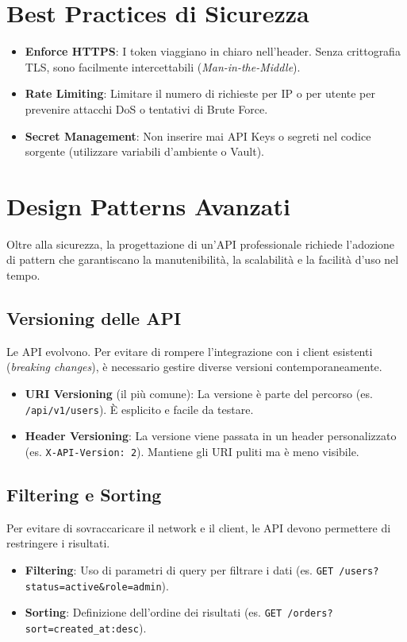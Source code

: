 \documentclass[11pt,a4paper]{report}
\begin{document}
\section{Best Practices di Sicurezza}
\begin{itemize}[leftmargin=3em]
    \item \textbf{Enforce HTTPS}: I token viaggiano in chiaro nell'header. Senza crittografia TLS, sono facilmente intercettabili (\textit{Man-in-the-Middle}).
    \item \textbf{Rate Limiting}: Limitare il numero di richieste per IP o per utente per prevenire attacchi DoS o tentativi di Brute Force.
    \item \textbf{Secret Management}: Non inserire mai API Keys o segreti nel codice sorgente (utilizzare variabili d'ambiente o Vault).
\end{itemize}

\section{Design Patterns Avanzati}
Oltre alla sicurezza, la progettazione di un'API professionale richiede l'adozione di pattern che garantiscano la manutenibilità, la scalabilità e la facilità d'uso nel tempo.

\subsection{Versioning delle API}
Le API evolvono. Per evitare di rompere l'integrazione con i client esistenti (\textit{breaking changes}), è necessario gestire diverse versioni contemporaneamente.
\begin{itemize}[leftmargin=3em]
    \item \textbf{URI Versioning} (il più comune): La versione è parte del percorso (es. \texttt{/api/v1/users}). \`E esplicito e facile da testare.
    \item \textbf{Header Versioning}: La versione viene passata in un header personalizzato (es. \texttt{X-API-Version: 2}). Mantiene gli URI puliti ma è meno visibile.
\end{itemize}

\subsection{Filtering e Sorting}
Per evitare di sovraccaricare il network e il client, le API devono permettere di restringere i risultati.
\begin{itemize}[leftmargin=3em]
    \item \textbf{Filtering}: Uso di parametri di query per filtrare i dati (es. \texttt{GET /users?status=active\&role=admin}).
    \item \textbf{Sorting}: Definizione dell'ordine dei risultati (es. \texttt{GET /orders?sort=created\_at:desc}).
\end{itemize}
\end{document}
